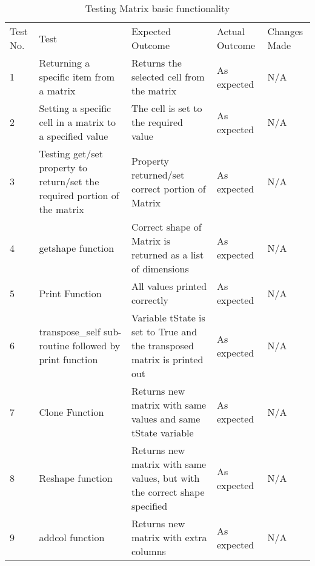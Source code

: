 \begin{table}[H]
    \begin{tabular}{|p{1cm}|p{4cm}|p{4cm}|p{3cm}|p{2cm}|}
        \hline
        Test No. & Test & Expected Outcome & Actual Outcome & Changes Made \\ \cline{1-5} 
        1 & Returning a specific item from a matrix & Returns the selected cell from the matrix & As expected & N/A \\ \cline{1-5}
        2 & Setting a specific cell in a matrix to a specified value & The cell is set to the required value & As expected & N/A \\ \cline{1-5}
        3 & Testing get/set property to return/set the required portion of the matrix & Property returned/set correct portion of Matrix & As expected & N/A \\ \cline{1-5}
        4 & getshape function & Correct shape of Matrix is returned as a list of dimensions & As expected & N/A \\ \cline{1-5}
        5 & Print Function & All values printed correctly & As expected & N/A \\ \cline{1-5}
        6 & transpose\_self sub-routine followed by print function & Variable tState is set to True and the transposed matrix is printed out & As expected & N/A \\ \cline{1-5}
        7 & Clone Function & Returns new matrix with same values and same tState variable & As expected & N/A \\
        \cline{1-5}
        8 & Reshape function & Returns new matrix with same values, but with the correct shape specified & As expected & N/A \\
        \cline{1-5}
        9 & addcol function & Returns new matrix with extra columns & As expected & N/A \\
        \cline{1-5}
    \end{tabular}
    \caption{Testing Matrix basic functionality}
\end{table}

